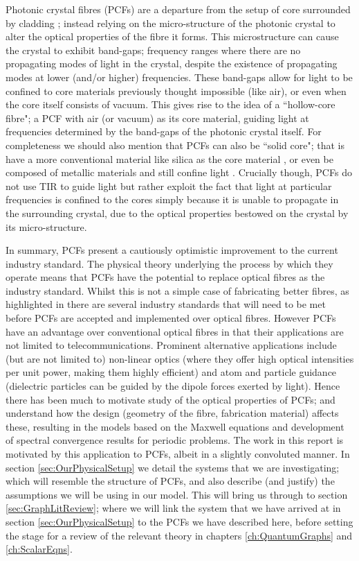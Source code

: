 Photonic crystal fibres (PCFs) are a departure from the setup of core surrounded by cladding \cite{russell2003photonic}; instead relying on the micro-structure of the photonic crystal to alter the optical properties of the fibre it forms.
This microstructure can cause the crystal to exhibit band-gaps; frequency ranges where there are no propagating modes of light in the crystal, despite the existence of propagating modes at lower (and/or higher) frequencies.
These band-gaps allow for light to be confined to core materials previously thought impossible (like air), or even when the core itself consists of vacuum.
This gives rise to the idea of a ``hollow-core fibre"; a PCF with air (or vacuum) as its core material, guiding light at frequencies determined by the band-gaps of the photonic crystal itself.
For completeness we should also mention that PCFs can also be ``solid core"; that is have a more conventional material like silica as the core material \cite{hou2008metallic}, or even be composed of metallic materials and still confine light \cite{luan2004allsolid}.
Crucially though, PCFs do not use TIR to guide light but rather exploit the fact that light at particular frequencies is confined to the cores simply because it is unable to propagate in the surrounding crystal, due to the optical properties bestowed on the crystal by its micro-structure.

In summary, PCFs present a cautiously optimistic improvement to the current industry standard.
The physical theory underlying the process by which they operate means that PCFs have the potential to replace optical fibres as the industry standard.
Whilst this is not a simple case of fabricating better fibres, as highlighted in \cite{knight2003photonic} there are several industry standards that will need to be met before PCFs are accepted and implemented over optical fibres.
However PCFs have an advantage over conventional optical fibres in that their applications are not limited to telecommunications.
Prominent alternative applications include (but are not limited to) non-linear optics (where they offer high optical intensities per unit power, making them highly efficient) and atom and particle guidance (dielectric particles can be guided by the dipole forces exerted by light).
Hence there has been much to motivate study of the optical properties of PCFs; and understand how the design (geometry of the fibre, fabrication material) affects these, resulting in the models based on the Maxwell equations and development of spectral convergence results for periodic problems.
The work in this report is motivated by this application to PCFs, albeit in a slightly convoluted manner.
In section \ref{sec:OurPhysicalSetup} we detail the systems that we are investigating; which will resemble the structure of PCFs, and also describe (and justify) the assumptions we will be using in our model.
This will bring us through to section \ref{sec:GraphLitReview}; where we will link the system that we have arrived at in section \ref{sec:OurPhysicalSetup} to the PCFs we have described here, before setting the stage for a review of the relevant theory in chapters \ref{ch:QuantumGraphs} and \ref{ch:ScalarEqns}.

